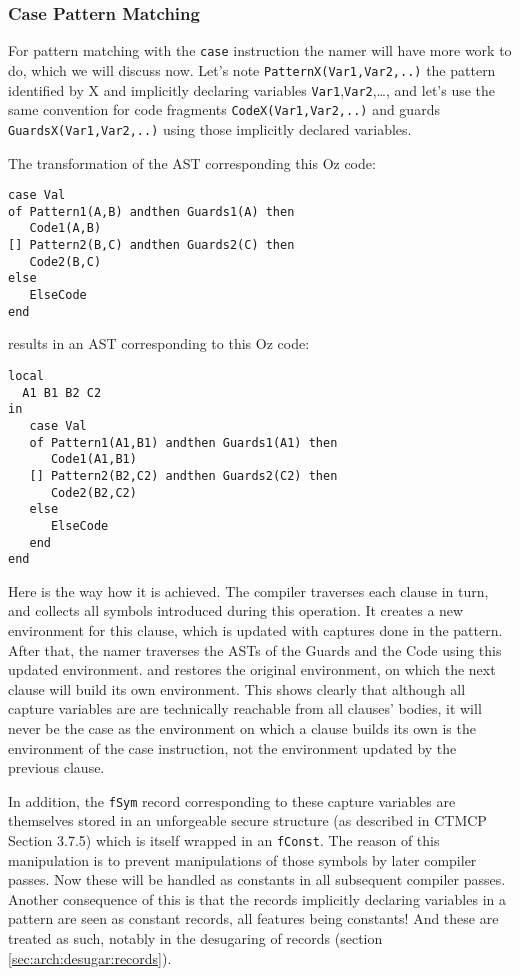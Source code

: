 \documentclass[a4paper]{memoir}
\begin{document}
\subsubsection{Case Pattern Matching}\label{sec:arch:namer:patternmatching}
For pattern matching with the \lstinline!case! instruction the namer will have
more work to do, which we will discuss now. Let's note
\lstinline!PatternX(Var1,Var2,..)! the pattern identified by X and implicitly
declaring variables \lstinline!Var1!,\lstinline!Var2!,\ldots, and let's use the same convention for code fragments \lstinline!CodeX(Var1,Var2,..)! and guards \lstinline!GuardsX(Var1,Var2,..)! using those implicitly declared variables.

The transformation of the AST corresponding this Oz code:
\begin{lstlisting}
case Val
of Pattern1(A,B) andthen Guards1(A) then
   Code1(A,B)
[] Pattern2(B,C) andthen Guards2(C) then
   Code2(B,C)
else
   ElseCode
end
\end{lstlisting}
results in an AST corresponding to this Oz code:
\begin{lstlisting}
local
  A1 B1 B2 C2
in
   case Val
   of Pattern1(A1,B1) andthen Guards1(A1) then
      Code1(A1,B1)
   [] Pattern2(B2,C2) andthen Guards2(C2) then
      Code2(B2,C2)
   else
      ElseCode
   end
end
\end{lstlisting}

Here is the way how it is achieved. The compiler traverses each clause in turn,
and collects all symbols introduced during this operation. It creates a new
environment for this clause, which is updated with captures done in the
pattern. After that, the namer traverses the ASTs of the Guards and the Code
using this updated environment. and restores the original environment, on which
the next clause will build its own environment. This shows clearly that
although all capture variables are are technically reachable from all clauses'
bodies, it will never be the case as the environment on which a clause builds
its own is the environment of the case instruction, not the environment updated
by the previous clause. 


In addition, the \lstinline!fSym! record corresponding to these capture
variables are themselves stored in an unforgeable secure structure (as
described in CTMCP Section 3.7.5) which is itself wrapped in an
\lstinline!fConst!. The reason of this manipulation is to prevent manipulations
of those symbols by later compiler passes. Now these will be handled as
constants in all subsequent compiler passes. Another consequence of this is
that the records implicitly declaring variables in a pattern are seen as
constant records, all features being constants! And these are treated as such,
notably in the desugaring of records (section \ref{sec:arch:desugar:records}).
\end{document}
